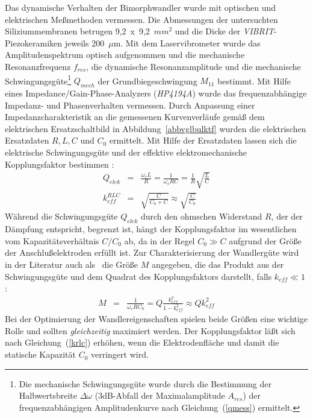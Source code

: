 Das dynamische Verhalten der Bimorphwandler wurde mit optischen und
elektrischen Meßmethoden vermessen. Die Abmessungen der untersuchten
Siliziummembranen betrugen 9,2~x~9,2~$mm^{2}$ und die Dicke der
{\sl VIBRIT}-Piezokeramiken jeweils 200~$\mu$m. Mit dem
Laservibrometer wurde das Amplitudenspektrum optisch aufgenommen und die
mechanische Resonanzfrequenz $f_{res}$, die dynamische Resonanzamplitude
und die mechanische Schwingungsgüte\footnote{Die mechanische
Schwingungsgüte wurde durch die Bestimmung der Halbwertsbreite
$\Delta \omega$ (3dB-Abfall der Maximalamplitude $A_{res}$)
der frequenzabhängigen Amplitudenkurve nach Gleichung~(\ref{qmess})
ermittelt.} $Q_{mech}$
der Grundbiegeschwingung $M_{11}$ bestimmt. Mit Hilfe eines
Impedance/Gain-Phase-Analyzers ({\sl HP4194A}) wurde das frequenzabhängige
Impedanz- und Phasenverhalten vermessen. Durch Anpassung einer
Impedanzcharakteristik an die gemessenen Kurvenverläufe gemäß dem
elektrischen Ersatzschaltbild in Abbildung~\ref{abbvglbulktf} wurden die
elektrischen Ersatzdaten $R, L, C$ und $C_{0}$ ermittelt. Mit Hilfe der
Ersatzdaten lassen sich die elektrische Schwingungsgüte und
der effektive elektromechanische Kopplungsfaktor bestimmen \cite{Til93}:
\begin{eqnarray}
\label{qkmelek}
 Q_{elek}       & = & \frac{\omega_{s}L}{R} = \frac{1}{\omega_{s}RC}
                  = \frac{1}{R} \sqrt{\frac{L}{C}} \\
\label{krlc}
 k_{eff}^{RLC}  & = & \sqrt{\frac{C}{C_{0} + C}}
                \approx \sqrt{\frac{C}{C_{0}}}
\end{eqnarray}
Während die Schwingungsgüte $Q_{elek}$ durch den ohmschen Widerstand $R$,
der der Dämpfung entspricht, begrenzt ist, hängt der Kopplungsfaktor im
wesentlichen
vom Kapazitätsverhältnis $C/C_{0}$ ab, da in der Regel $C_{0} \gg C$
aufgrund der Größe der Anschlußelektroden erfüllt ist.
Zur Charakterisierung der Wandlergüte wird in der Literatur auch als
\grqq \, die Größe $M$ angegeben, die das Produkt
aus der Schwingungsgüte und dem Quadrat des Kopplungsfaktors darstellt,
falls $k_{eff} \ll 1$ \cite{IEEE}:
\begin{eqnarray}
\label{merit}
 M & = & \frac{1}{\omega_{s}RC_{0}}
     = Q \frac{k_{eff}^2}{1 - k_{eff}^2} \approx Q k_{eff}^2
\end{eqnarray}
Bei der Optimierung der Wandlereigenschaften spielen beide Größen eine
wichtige Rolle und sollten {\em gleichzeitig} maximiert werden.
Der Kopplungsfaktor läßt sich nach Gleichung~(\ref{krlc}) erhöhen, wenn die
Elektrodenfläche und damit die statische Kapazität $C_{0}$ verringert wird.
